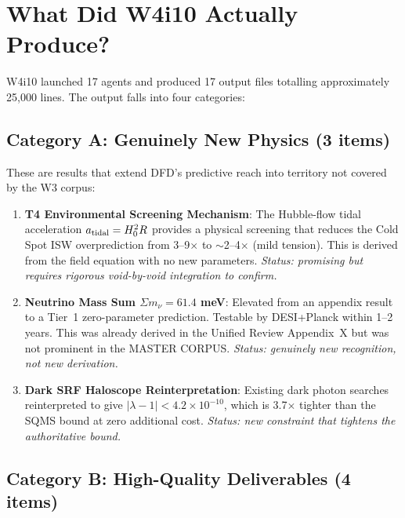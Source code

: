 \documentclass[11pt]{article}
\newcommand{\ee}[1]{\times 10^{#1}}
\newcommand{\lbone}{|\lambda - 1|}
\begin{document}
\section{What Did W4i10 Actually Produce?}
\label{sec:w4i10-assessment}

W4i10 launched 17 agents and produced 17 output files totalling
approximately 25,000 lines. The output falls into four categories:

\subsection{Category A: Genuinely New Physics (3 items)}

These are results that extend DFD's predictive reach into territory not
covered by the W3 corpus:

\begin{enumerate}
\item \textbf{T4 Environmental Screening Mechanism}: The Hubble-flow
  tidal acceleration $a_{\rm tidal} = H_0^2 R$ provides a physical
  screening that reduces the Cold Spot ISW overprediction from 3--9$\times$
  to $\sim$2--4$\times$ (mild tension). This is derived from the field
  equation with no new parameters. \emph{Status: promising but requires
  rigorous void-by-void integration to confirm.}

\item \textbf{Neutrino Mass Sum $\Sigma m_\nu = 61.4$ meV}: Elevated
  from an appendix result to a Tier~1 zero-parameter prediction. Testable
  by DESI+Planck within 1--2 years. This was already derived in the
  Unified Review Appendix~X but was not prominent in the MASTER CORPUS.
  \emph{Status: genuinely new \emph{recognition}, not new derivation.}

\item \textbf{Dark SRF Haloscope Reinterpretation}: Existing dark photon
  searches reinterpreted to give $\lbone < 4.2\ee{-10}$, which is 3.7$\times$
  tighter than the SQMS bound at zero additional cost. \emph{Status: new
  constraint that tightens the authoritative bound.}
\end{enumerate}

\subsection{Category B: High-Quality Deliverables (4 items)}
\end{document}
